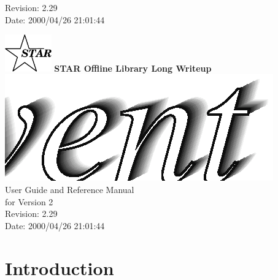 \documentclass[twoside]{article}
\begin{document}
  {\LARGE $ $Revision: 2.29 $ $}  \\[5mm] %
  {\LARGE $ $Date: 2000/04/26 21:01:44 $ $}  %
%
%
\begin{titlepage}
\pagestyle{empty}
\vspace*{-25mm}
\begin{center}
  \mbox{\includegraphics[width=2cm]{StarIcon.eps}}
  {\Large\bf STAR Offline Library Long Writeup}
  \hfill\mbox{}\\[3cm]
  \mbox{\includegraphics[width=\textwidth]{StEventTitle.eps}}
  \hfill\mbox{}\\[3cm]
  {\LARGE User Guide and Reference Manual \\[5mm] for Version 2}\\[2cm]
  {\LARGE $ $Revision: 2.29 $ $}  \\[5mm] %
  {\LARGE $ $Date: 2000/04/26 21:01:44 $ $}  %
  \vfill
\end{center}
\cleardoublepage
\end{titlepage}

%
%
\tableofcontents
\cleardoublepage

%
%

\section{Introduction} %
\end{document}
